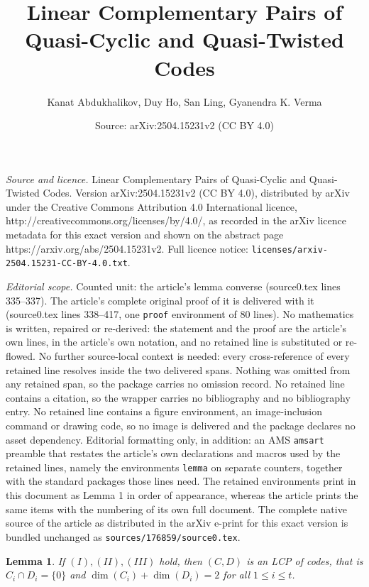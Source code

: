 \documentclass[10pt,a4paper]{amsart}
\title{Linear Complementary Pairs of Quasi-Cyclic and Quasi-Twisted Codes}
\author{Kanat Abdukhalikov, Duy Ho, San Ling, Gyanendra K. Verma}
\date{Source: arXiv:2504.15231v2 (CC BY 4.0)}
\newtheorem{lemma}{Lemma}
\begin{document}
\maketitle

\noindent\emph{Source and licence.} Linear Complementary Pairs of Quasi-Cyclic and Quasi-Twisted Codes. Version arXiv:2504.15231v2 (CC BY 4.0), distributed by arXiv under the Creative Commons Attribution 4.0 International licence, http://creativecommons.org/licenses/by/4.0/, as recorded in the arXiv licence metadata for this exact version and shown on the abstract page https://arxiv.org/abs/2504.15231v2. Full licence notice: \texttt{licenses/arxiv-2504.15231-CC-BY-4.0.txt}.\par\smallskip

\noindent\textit{Editorial scope.} Counted unit: the article's lemma converse (source0.tex lines 335--337). The article's complete original proof of it is delivered with it (source0.tex lines 338--417, one \texttt{proof} environment of 80 lines). No mathematics is written, repaired or re-derived: the statement and the proof are the article's own lines, in the article's own notation, and no retained line is substituted or re-flowed.  No further source-local context is needed: every cross-reference of every retained line resolves inside the two delivered spans.  Nothing was omitted from any retained span, so the package carries no omission record.  No retained line contains a citation, so the wrapper carries no bibliography and no bibliography entry.  No retained line contains a figure environment, an image-inclusion command or drawing code, so no image is delivered and the package declares no asset dependency.  Editorial formatting only, in addition: an AMS \texttt{amsart} preamble that restates the article's own declarations and macros used by the retained lines, namely the environments \texttt{lemma} on separate counters, together with the standard packages those lines need.  The retained environments print in this document as Lemma 1 in order of appearance, whereas the article prints the same items with the numbering of its own full document.  The complete native source of the article as distributed in the arXiv e-print for this exact version is bundled unchanged as \texttt{sources/176859/source0.tex}.
\begin{lemma}\label{converse}
    If $(I),(II),(III)$ hold, then $(C,D)$ is an LCP of codes, that is $C_i\cap D_i=\{0\}$ and $\dim(C_i)+\dim(D_i)=2$ for all $1\leq i\leq t$.
\end{lemma}
\end{document}
